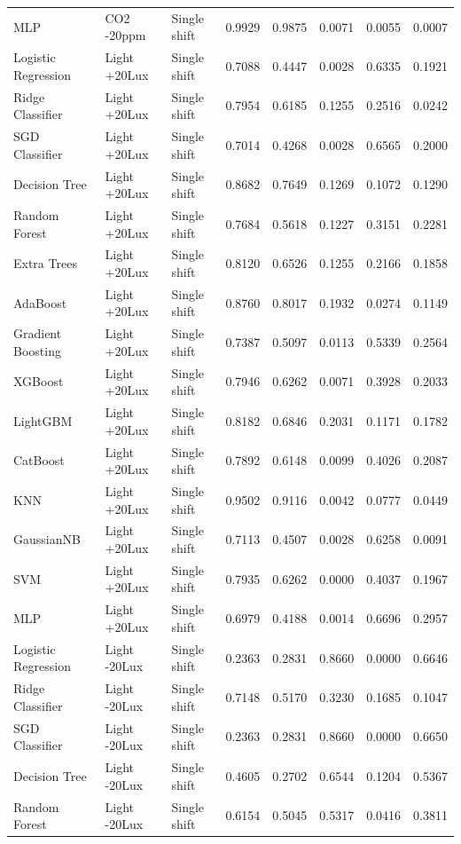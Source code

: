 \begin{tabular}{lllrrrrr}
MLP & CO2 -20ppm & Single shift & 0.9929 & 0.9875 & 0.0071 & 0.0055 & 0.0007 \\
Logistic Regression & Light +20Lux & Single shift & 0.7088 & 0.4447 & 0.0028 & 0.6335 & 0.1921 \\
Ridge Classifier & Light +20Lux & Single shift & 0.7954 & 0.6185 & 0.1255 & 0.2516 & 0.0242 \\
SGD Classifier & Light +20Lux & Single shift & 0.7014 & 0.4268 & 0.0028 & 0.6565 & 0.2000 \\
Decision Tree & Light +20Lux & Single shift & 0.8682 & 0.7649 & 0.1269 & 0.1072 & 0.1290 \\
Random Forest & Light +20Lux & Single shift & 0.7684 & 0.5618 & 0.1227 & 0.3151 & 0.2281 \\
Extra Trees & Light +20Lux & Single shift & 0.8120 & 0.6526 & 0.1255 & 0.2166 & 0.1858 \\
AdaBoost & Light +20Lux & Single shift & 0.8760 & 0.8017 & 0.1932 & 0.0274 & 0.1149 \\
Gradient Boosting & Light +20Lux & Single shift & 0.7387 & 0.5097 & 0.0113 & 0.5339 & 0.2564 \\
XGBoost & Light +20Lux & Single shift & 0.7946 & 0.6262 & 0.0071 & 0.3928 & 0.2033 \\
LightGBM & Light +20Lux & Single shift & 0.8182 & 0.6846 & 0.2031 & 0.1171 & 0.1782 \\
CatBoost & Light +20Lux & Single shift & 0.7892 & 0.6148 & 0.0099 & 0.4026 & 0.2087 \\
KNN & Light +20Lux & Single shift & 0.9502 & 0.9116 & 0.0042 & 0.0777 & 0.0449 \\
GaussianNB & Light +20Lux & Single shift & 0.7113 & 0.4507 & 0.0028 & 0.6258 & 0.0091 \\
SVM & Light +20Lux & Single shift & 0.7935 & 0.6262 & 0.0000 & 0.4037 & 0.1967 \\
MLP & Light +20Lux & Single shift & 0.6979 & 0.4188 & 0.0014 & 0.6696 & 0.2957 \\
Logistic Regression & Light -20Lux & Single shift & 0.2363 & 0.2831 & 0.8660 & 0.0000 & 0.6646 \\
Ridge Classifier & Light -20Lux & Single shift & 0.7148 & 0.5170 & 0.3230 & 0.1685 & 0.1047 \\
SGD Classifier & Light -20Lux & Single shift & 0.2363 & 0.2831 & 0.8660 & 0.0000 & 0.6650 \\
Decision Tree & Light -20Lux & Single shift & 0.4605 & 0.2702 & 0.6544 & 0.1204 & 0.5367 \\
Random Forest & Light -20Lux & Single shift & 0.6154 & 0.5045 & 0.5317 & 0.0416 & 0.3811 \\

\end{tabular}
